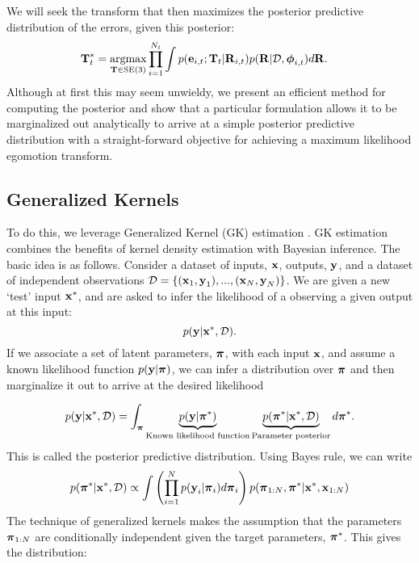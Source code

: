 We will seek the transform that then maximizes the posterior predictive distribution of the errors, given this posterior:
\begin{align}
\label{eq:probe_vo_objective}
  \boldsymbol{\mathbf{T}}_t^* &=  \operatorname*{argmax}_{\boldsymbol{\mathbf{T}}\in\text{SE}(3)} \prod_{i=1}^{N_t} \int p(\boldsymbol{\mathbf{e}}_{i,t}; \boldsymbol{\mathbf{T}}_t |  \boldsymbol{\mathbf{R}}_{i,t}) p(\boldsymbol{\mathbf{R}}|\mathcal{D}, \boldsymbol{\mathbf{\phi}}_{i,t}) d\boldsymbol{\mathbf{R}}.
\end{align}
Although at first this may seem unwieldy, we present an efficient method for computing the posterior and show that a particular formulation allows it to be marginalized out analytically to arrive at a simple posterior predictive distribution with a straight-forward objective for achieving a maximum likelihood egomotion transform.
\subsection{Generalized Kernels}
To do this, we leverage Generalized Kernel (GK) estimation \citep{Vega-Brown2014-sb}. GK estimation combines the benefits of kernel density estimation with Bayesian inference. The basic idea is as follows. 
Consider a dataset of inputs, $\boldsymbol{\mathbf{x}}$, outputs, $\boldsymbol{\mathbf{y}}$,  and a dataset of independent observations $\mathcal{D} = \{(\boldsymbol{\mathbf{x}}_1, \boldsymbol{\mathbf{y}}_1), ..., (\boldsymbol{\mathbf{x}}_N, \boldsymbol{\mathbf{y}}_N) \}$. We are given a new `test' input $\boldsymbol{\mathbf{x}}^*$, and are asked to infer the likelihood of a observing a given output at this input:
\begin{equation}
p(\boldsymbol{\mathbf{y}} | 	\boldsymbol{\mathbf{x}}^*, \mathcal{D}).
\end{equation}
 If we associate a set of latent parameters, $\boldsymbol{\mathbf{\pi}}$, with each input $\boldsymbol{\mathbf{x}}$, and assume a known likelihood function $p(\boldsymbol{\mathbf{y}}|\boldsymbol{\mathbf{\pi}})$, we can infer a distribution over $\boldsymbol{\mathbf{\pi}}$ and then marginalize it out to arrive at the desired likelihood

\begin{equation}
p(\boldsymbol{\mathbf{y}} | 	\boldsymbol{\mathbf{x}}^*, \mathcal{D}) = \int_{\boldsymbol{\mathbf{\pi}}} \underbrace{p(\boldsymbol{\mathbf{y}} | \boldsymbol{\mathbf{\pi}}^*)}_{\text{Known likelihood function}} \underbrace{p(\boldsymbol{\mathbf{\pi}}^* | \boldsymbol{\mathbf{x}}^*, \mathcal{D})}_{\text{Parameter posterior}} d\boldsymbol{\mathbf{\pi}}^*.
\end{equation}
This is called the posterior predictive distribution. Using Bayes rule, we can write
\begin{equation}
\label{eq:probe_posterior_bayes_rule}
p(\boldsymbol{\mathbf{\pi}}^* | \boldsymbol{\mathbf{x}}^*, \mathcal{D}) \propto \int \left( \prod_{i=1}^N p(\boldsymbol{\mathbf{y}}_i | \boldsymbol{\mathbf{\pi}}_i)d\boldsymbol{\mathbf{\pi}}_i \right) p(\boldsymbol{\mathbf{\pi}}_{1:N}, \boldsymbol{\mathbf{\pi}}^*| \boldsymbol{\mathbf{x}}^*, \boldsymbol{\mathbf{x}}_{1:N})
\end{equation}
The technique of generalized kernels makes the assumption that the parameters $\boldsymbol{\mathbf{\pi}}_{1:N}$ are conditionally independent given the target parameters, $\boldsymbol{\mathbf{\pi}}^*$. This gives the distribution:

